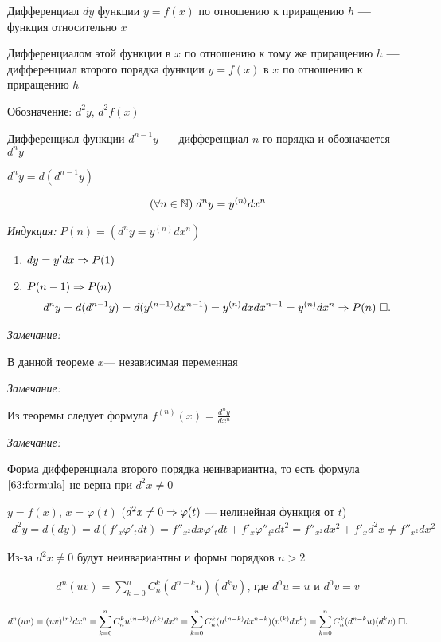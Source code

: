 \documentclass{article}
\begin{document}


Дифференциал $dy$ функции $y=f(x)$ по отношению к приращению $h$ \textbf{---} функция относительно $x$

Дифференциалом этой функции в $x$ по отношению к тому же приращению $h$ \textbf{---} дифференциал второго порядка функции $y=f(x)$ в $x$ по отношению к приращению $h$

Обозначение: $d^{2}y$, $d^{2}f(x)$

Дифференциал функции $d^{n-1}y$ \textbf{---} дифференциал $n$-го порядка и обозначается $d^{n}y$

$d^{n}y=d(d^{n-1}y)$

\theorem
\begin{align}
	(\forall n\in\N)\;d^{n}y=y^{(n)}dx^{n} \label{63:formula}
\end{align}

\proof

{\it Индукция:} $P(n)=(d^{n}y=y^{(n)}dx^{n})$
\begin{enumerate}
	\item{}$dy=y'dx\Rarr P(1)$
	\item{}$P(n-1)\Rarr P(n)$
	\begin{align*}
		d^{n}y=d(d^{n-1}y)=d(y^{(n-1)}dx^{n-1})=y^{(n)}dxdx^{n-1}=y^{(n)}dx^{n}\Rarr P(n)\qed
	\end{align*}
\end{enumerate}

{\it Замечание: }

В данной теореме $x$--- независимая переменная

{\it Замечание: }

Из теоремы следует формула $f^{(n)}(x)=\frac{d^{n}y}{dx^{n}}$

{\it Замечание: }

Форма дифференциала второго порядка неинвариантна, то есть формула $\eqref{63:formula}$ не верна при $d^{2}x\neq 0$

$y=f(x)$, $x=\varphi(t)$ ($d^{2}x\neq 0\Rarr\varphi(t)$ --- нелинейная функция от $t$)
\begin{align*}
	d^{2}y=d(dy)=d(f'_{x}\varphi'_{t}dt)=f''_{x^{2}}dx\varphi'_{t}dt+f'_{x}\varphi''_{t^{2}}dt^{2}=f''_{x^{2}}dx^{2}+f'_{x}d^{2}x\neq f''_{x^{2}}dx^{2}
\end{align*}

Из-за $d^{2}x\neq 0$ будут неинвариантны и формы порядков $n>2$

\begin{align*}
	d^{n}(uv)=\sum_{k=0}^{n}C_{n}^{k}(d^{n-k}u)(d^{k}v)\text{, где }d^{0}u=u \text{ и } d^{0}v=v
\end{align*}

\proof
\begin{align*}
	d^{n}(uv)=(uv)^{(n)}dx^{n}=\sum_{k=0}^{n}C_{n}^{k}u^{(n-k)}v^{(k)}dx^{n}=\sum_{k=0}^{n}C_{n}^{k}(u^{(n-k)}dx^{n-k})(v^{(k)}dx^{k})=\sum_{k=0}^{n}C_{n}^{k}(d^{n-k}u)(d^{k}v)\qed
\end{align*}
\end{document}
